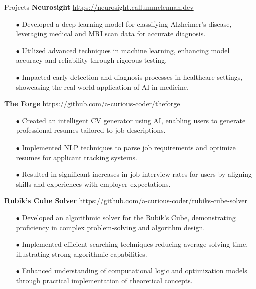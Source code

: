 \begin{rSection}{Projects}
\vspace{0.12cm}
{\bf Neurosight}
\hspace{2 cm}{Python, TensorFlow, Machine Learning}
\hfill{\href{https://neurosight.callummclennan.dev}{https://neurosight.callummclennan.dev}}
\begin{itemize}[label=\myfancylabel, leftmargin=0.5cm, topsep=-5pt]
    \item[$\bullet$] Developed a deep learning model for classifying Alzheimer's disease, leveraging 
          medical and MRI scan data for accurate diagnosis.
    \item[$\bullet$] Utilized advanced techniques in machine learning, enhancing model accuracy 
          and reliability through rigorous testing.
    \item[$\bullet$] Impacted early detection and diagnosis processes in healthcare settings, 
          showcasing the real-world application of AI in medicine.
\end{itemize}

\vspace{0.12cm}
{\bf The Forge}
\hspace{2 cm}{Python, Flask, Natural Language Processing}
\hfill{\href{https://github.com/a-curious-coder/theforge}{https://github.com/a-curious-coder/theforge}}
\begin{itemize}[label=\myfancylabel, leftmargin=0.5cm, topsep=-5pt]
    \item[$\bullet$] Created an intelligent CV generator using AI, enabling users to generate 
          professional resumes tailored to job descriptions.
    \item[$\bullet$] Implemented NLP techniques to parse job requirements and optimize resumes 
          for applicant tracking systems.
    \item[$\bullet$] Resulted in significant increases in job interview rates for users by 
          aligning skills and experiences with employer expectations.
\end{itemize}

\vspace{0.12cm}
{\bf Rubik's Cube Solver}
\hspace{2 cm}{Processing, Algorithms, Problem Solving}
\hfill{\href{https://github.com/a-curious-coder/rubiks-cube-solver}{https://github.com/a-curious-coder/rubiks-cube-solver}}
\begin{itemize}[label=\myfancylabel, leftmargin=0.5cm, topsep=-5pt]
    \item[$\bullet$] Developed an algorithmic solver for the Rubik's Cube, demonstrating 
          proficiency in complex problem-solving and algorithm design.
    \item[$\bullet$] Implemented efficient searching techniques reducing average solving time, 
          illustrating strong algorithmic capabilities.
    \item[$\bullet$] Enhanced understanding of computational logic and optimization models through 
          practical implementation of theoretical concepts.
\end{itemize}


\end{rSection}
